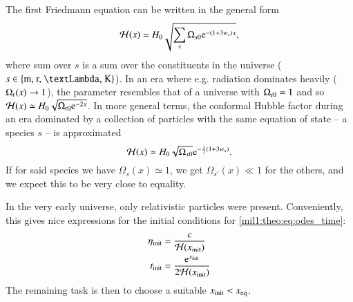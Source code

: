     The first Friedmann equation can be written in the general form
    \begin{equation}\label{mil1:theo:eq:Hp_of_x_general_form}
        \Hp(x) = H_0 \sqrt{\sum_{s}\Omega_{s0}\eu^{-(1+3w_s)x}},
    \end{equation}
    where sum over $s$ is a sum over the constituents in the universe ($s\in\left\{\text{m, r, \textLambda, K} \right\}$). In an era where e.g. radiation dominates heavily ($\OmgR[](x)\to 1$), the parameter resembles that of a universe with $\OmgR=1$ and so $\Hp(x)\simeq H_0\sqrt{\OmgR \eu^{-2x}}$. In more general terms, the conformal Hubble factor during an era dominated by a collection of particles with the same equation of state -- a species $s$ -- is approximated
    \begin{equation}\label{mil1:theo:eq:Hp_of_x_approximated}
        \Hp(x) \simeq H_0 \sqrt{\Omega_{s0}} \eu^{-\frac{x}{2}(1+3w_s)}.
    \end{equation}
    If for said species we have $\Omega_{s}(x)\simeq 1$, we get $\Omega_{s'}(x)\ll 1$ for the others, and we expect this to be very close to equality. 

    In the very early universe, only relativistic particles were present. Conveniently, this gives nice expressions for the initial conditions for \cref{mil1:theo:eq:odes_time}:
    \begin{equation}\label{mil1:theo:eq:time_initial_conditions}
        \begin{split}
            \eta\ped{init} &= \frac{c}{\Hp(x\ped{init})} \\
            t\ped{init} &= \frac{\eu^{x\ped{init}}}{2 \Hp(x\ped{init})}
        \end{split}
    \end{equation}
    The remaining task is then to choose a suitable $x\ped{init} < x\ped{eq}$. 




